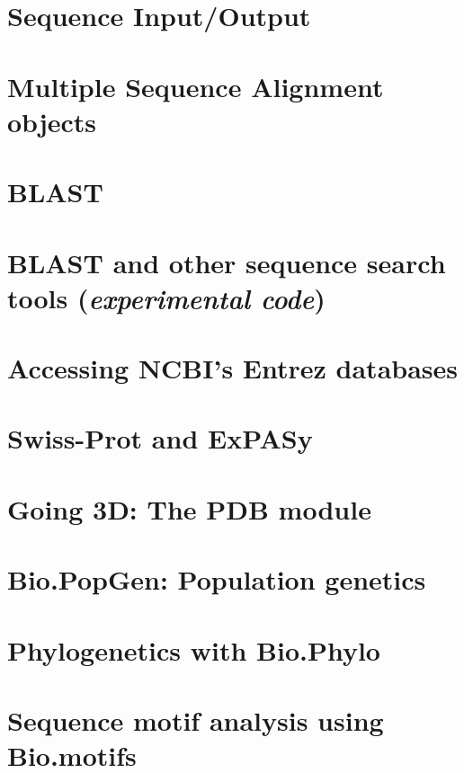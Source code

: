\documentclass{report}
\begin{document}
\chapter{Sequence Input/Output}
\label{chapter:Bio.SeqIO}


\chapter{Multiple Sequence Alignment objects}
\label{chapter:Bio.AlignIO}


\chapter{BLAST}
\label{chapter:blast}


\chapter{BLAST and other sequence search tools (\textit{experimental code})}
\label{chapter:searchio}


\chapter{Accessing NCBI's Entrez databases}
\label{chapter:entrez}


\chapter{Swiss-Prot and ExPASy}
\label{chapter:swiss_prot}


\chapter{Going 3D: The PDB module}


\chapter{Bio.PopGen: Population genetics}


\chapter{Phylogenetics with Bio.Phylo}
\label{sec:Phylo}


\chapter{Sequence motif analysis using Bio.motifs}

\end{document}
